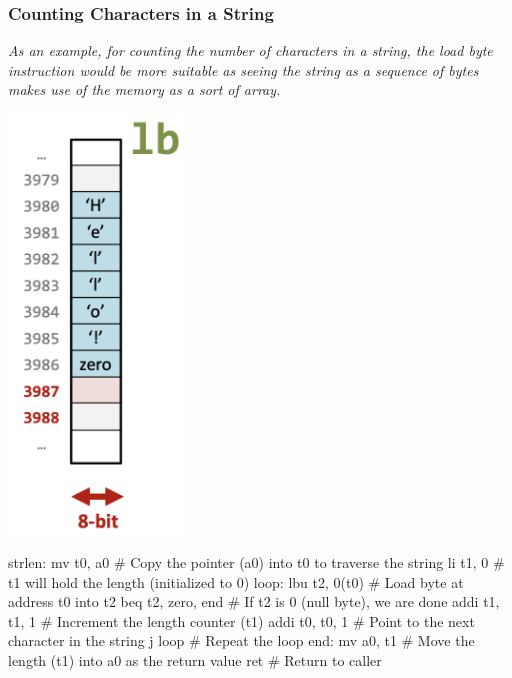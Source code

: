 \subsubsection{Counting Characters in a String}
\textit{As an example, for counting the number of characters in a string, the load byte instruction would be more suitable as seeing the string as a sequence of bytes makes use of the memory as a sort of array.} \\ \vspace*{5px}
\begin{minipage}[htp]{0.45\textwidth}   
    \begin{center}
        \includegraphics[width=0.35\textwidth]{chapters/chapter1c/images/hello2.png}
    \end{center}
\end{minipage}
\hfill
\vline
\hfill
\begin{minipage}[htp]{0.45\textwidth}
\begin{assembly}
strlen:
    mv t0, a0 # Copy the pointer (a0) into t0 to traverse the string
    li t1, 0 # t1 will hold the length (initialized to 0)
loop:
    lbu t2, 0(t0) # Load byte at address t0 into t2
    beq t2, zero, end # If t2 is 0 (null byte), we are done
    addi t1, t1, 1 # Increment the length counter (t1)
    addi t0, t0, 1 # Point to the next character in the string
j loop # Repeat the loop
end:
    mv a0, t1 # Move the length (t1) into a0 as the return value
    ret # Return to caller
\end{assembly}
\end{minipage}\\ \vspace*{5px}
